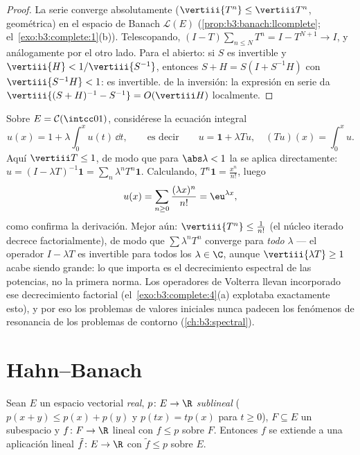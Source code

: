 \begin{proof}
La serie converge absolutamente ($\vertiii{T^n} \leq \vertiii
T^n$, geométrica) en el espacio de Banach $\mathcal L(E)$
(\cref{prop:b3:banach:llcomplete};
el~\cref{exo:b3:complete:1}(b)). Telescopando, $(I - T)\sum_{n \leq
N}T^n = I - T^{N+1} \to I$, y análogamente por el otro lado. Para el
 abierto: si $S$ es invertible y $\vertiii{H} <
1/\vertiii{S^{-1}}$, entonces $S + H = S(I + S^{-1}H)$ con
$\vertiii{S^{-1}H} < 1$: es invertible.
 de la inversión: la
expresión en serie da $\vertiii{(S+H)^{-1} - S^{-1}} =
O(\vertiii H)$ localmente.
\end{proof}

\begin{example}
\label{ex:b3:banach:volterraexample}
Sobre $E = \mathcal C(\intcc01)$, considérese la ecuación integral
\[
u(x) = 1 + \lambda\int_0^xu(t)\,\dd t,
\qquad\text{es decir}\qquad u = \mathbf 1 + \lambda Tu,
\quad (Tu)(x) = \int_0^xu .
\]
Aquí $\vertiii T \leq 1$, de modo que para $\abs\lambda < 1$ la
 se aplica
directamente: $u = (I - \lambda T)^{-1}\mathbf 1 =
\sum_n\lambda^nT^n\mathbf 1$. Calculando, $T^n\mathbf 1 =
\frac{x^n}{n!}$, luego
\[
u(x) = \sum_{n\geq0}\frac{(\lambda x)^n}{n!} =
\eu^{\lambda x} ,
\]
como confirma la derivación. Mejor aún: $\vertiii{T^n} \leq
\frac1{n!}$ (el núcleo iterado decrece factorialmente), de modo que
$\sum\lambda^nT^n$ converge para \emph{todo} $\lambda$ --- el operador
$I - \lambda T$ es invertible para todos los $\lambda
\in \C$, aunque $\vertiii{\lambda T} \geq 1$ acabe siendo grande: lo que
importa es el decrecimiento espectral de las potencias, no la primera
norma. Los operadores de Volterra llevan incorporado ese decrecimiento
factorial (el~\cref{exo:b3:complete:4}(a) explotaba exactamente esto), y
por eso los problemas de valores iniciales nunca padecen los fenómenos
de resonancia de los problemas de contorno
(\cref{ch:b3:spectral}).
\end{example}

\section{Hahn--Banach}

\begin{theorem}
\label{thm:b3:banach:hahnbanach}
Sean $E$ un espacio vectorial \emph{real}, $p \colon E \to \R$
\emph{sublineal} ($p(x + y) \leq p(x) + p(y)$ y $p(tx) =
tp(x)$ para $t \geq 0$), $F \subseteq E$ un subespacio y $f
\colon F \to \R$ lineal con $f \leq p$ sobre $F$. Entonces $f$ se
extiende a una aplicación lineal $\tilde f \colon E \to \R$ con
$\tilde f \leq p$ sobre $E$.
\end{theorem}

